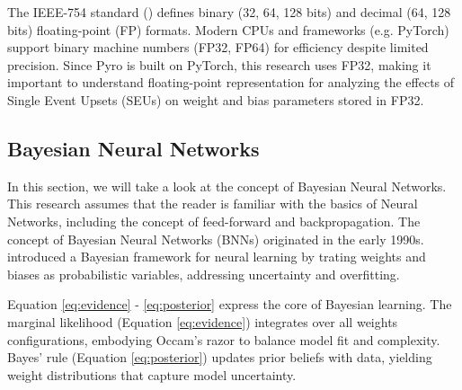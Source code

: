 The IEEE-754 standard (\cite{IEEE754-2019}) defines binary (32, 64, 128 bits) and decimal (64, 128 bits) floating-point (FP) formats. Modern CPUs and frameworks (e.g. PyTorch) support binary machine numbers (FP32, FP64) for efficiency despite limited precision. Since Pyro is built on PyTorch, this research uses FP32, making it important to understand floating-point representation for analyzing the effects of Single Event Upsets (SEUs) on weight and bias parameters stored in FP32.


\subsection{Bayesian Neural Networks}
\noindent

In this section, we will take a look at the concept of Bayesian Neural Networks. This research assumes that the reader is familiar with the basics of Neural Networks, including the concept of feed-forward and backpropagation. The concept of Bayesian Neural Networks (BNNs) originated in the early 1990s. \cite{Mackay1992a} introduced a Bayesian framework for neural learning by trating weights and biases as probabilistic variables, addressing uncertainty and overfitting. 


Equation \ref{eq:evidence} - \ref{eq:posterior} express the core of Bayesian learning. The marginal likelihood (Equation \ref{eq:evidence}) integrates over all weights configurations, embodying Occam's razor to balance model fit and complexity. Bayes' rule (Equation \ref{eq:posterior}) updates prior beliefs with data, yielding weight distributions that capture model uncertainty.


